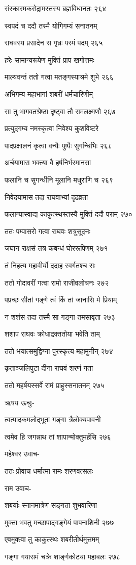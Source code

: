 संस्कारमकरोद्रामस्तस्य ब्रह्मविधानतः २६४

स्वपदं च ददौ तस्मै योगिगम्यं सनातनम्

राघवस्य प्रसादेन स गृध्रः परमं पदम् २६५

हरेः सामान्यरूपेण मुक्तिं प्राप खगोत्तमः

माल्यवन्तं ततो गत्वा मतङ्गस्याश्रमे शुभे २६६

अभिगम्य महाभागां शबरीं धर्मचारिणीम्

सा तु भागवतश्रेष्ठा दृष्ट्वा तौ रामलक्ष्मणौ २६७

प्रत्युद्गम्य नमस्कृत्वा निवेश्य कुशविष्टरे

पादप्रक्षालनं कृत्वा वन्यैः पुष्पैः सुगन्धिभिः २६८

अर्चयामास भक्त्या वै हर्षनिर्भरमानसा

फलानि च सुगन्धीनि मूलानि मधुराणि च २६९

निवेदयामास तदा राघवाभ्यां दृढव्रता

फलान्यास्वाद्य काकुत्स्थस्तस्यै मुक्तिं ददौ पराम् २७०

ततः पम्पासरो गत्वा राघवः शत्रुसूदनः

जघान राक्षसं तत्र कबन्धं घोररूपिणम् २७१

तं निहत्य महावीर्यो ददाह स्वर्गतश्च सः

ततो गोदावरीं गत्वा रामो राजीवलोचनः २७२

पप्रच्छ सीतां गङ्गे त्वं किं तां जानासि मे प्रियाम्

न शशंस तदा तस्मै सा गङ्गा तमसावृता २७३

शशाप राघवः क्रोधाद्रक्ततोया भवेति ताम्

ततो भयात्समुद्विग्ना पुरस्कृत्य महामुनीन् २७४

कृताञ्जलिपुटा दीना राघवं शरणं गता

ततो महर्षयस्सर्वे रामं प्राहुस्सनातनम् २७५

ऋषय ऊचुः-

त्वत्पादकमलोद्भूता गङ्गा त्रैलोक्यपावनी

त्वमेव हि जगन्नाथ तां शापान्मोक्तुमर्हसि २७६

महेश्वर उवाच-

ततः प्रोवाच धर्मात्मा रामः शरणवत्सलः

राम उवाच-

शबर्याः स्नानमात्रेण सङ्गता शुभवारिणा

मुक्ता भवतु मच्छापाद्गङ्गेयं पापनाशिनी २७७

एवमुक्त्वा तु काकुत्स्थः शबरीतीर्थमुत्तमम्

गङ्गा गयासमं चक्रे शार्ङ्गकोट्या महाबलः २७८

